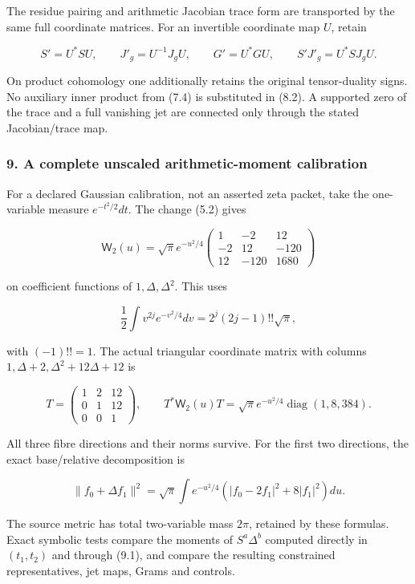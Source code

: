 The residue pairing and arithmetic Jacobian trace form are transported
by the same full coordinate matrices. For an invertible coordinate map
\(U\), retain

\[S'=U^*S U,\qquad J'_g=U^{-1}J_gU,\qquad G'=U^*G U,\qquad
S'J'_g=U^*S J_gU.\tag{8.2}\]

On product cohomology one additionally retains the original
tensor-duality signs. No auxiliary inner product from (7.4) is
substituted in (8.2). A supported zero of the trace and a full vanishing
jet are connected only through the stated Jacobian/trace map.

\subsubsection{9. A complete unscaled arithmetic-moment
calibration}\label{spectral_sum_full:a-complete-unscaled-arithmetic-moment-calibration}

For a declared Gaussian calibration, not an asserted zeta packet, take
the one-variable measure \(e^{-t^2/2}dt\). The change (5.2) gives

\[\mathsf W_2(u)=\sqrt\pi e^{-u^2/4}
\begin{pmatrix}
1&-2&12\\-2&12&-120\\12&-120&1680
\end{pmatrix}\tag{9.1}\]

on coefficient functions of \(1,\Delta,\Delta^2\). This uses

\[\frac12\int v^{2j}e^{-v^2/4}dv=2^j(2j-1)!!\sqrt\pi,\]

with \((-1)!!=1\). The actual triangular coordinate matrix with columns
\(1,\Delta+2,\Delta^2+12\Delta+12\) is

\[T=\begin{pmatrix}1&2&12\\0&1&12\\0&0&1\end{pmatrix},\qquad
T^*\mathsf W_2(u)T=\sqrt\pi e^{-u^2/4}\operatorname{diag}(1,8,384).\tag{9.2}\]

All three fibre directions and their norms survive. For the first two
directions, the exact base/relative decomposition is

\[\|f_0+\Delta f_1\|^2
=\sqrt\pi\int e^{-u^2/4}\left(|f_0-2f_1|^2+8|f_1|^2\right)du.\tag{9.3}\]

The source metric has total two-variable mass \(2\pi\), retained by
these formulas. Exact symbolic tests compare the moments of
\(S^a\Delta^b\) computed directly in \((t_1,t_2)\) and through (9.1),
and compare the resulting constrained representatives, jet maps, Grams
and controls.

